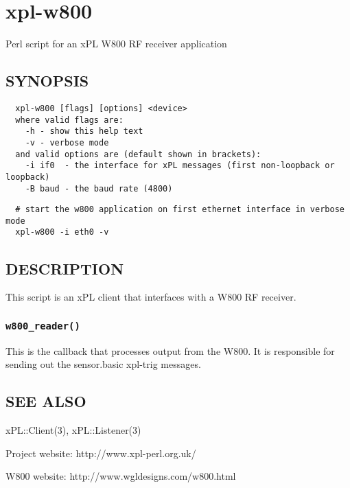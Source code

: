 \section{xpl-w800\label{xpl-w800}}


Perl script for an xPL W800 RF receiver application

\subsection*{SYNOPSIS\label{xpl-w800_SYNOPSIS}}
\begin{verbatim}
  xpl-w800 [flags] [options] <device>
  where valid flags are:
    -h - show this help text
    -v - verbose mode
  and valid options are (default shown in brackets):
    -i if0  - the interface for xPL messages (first non-loopback or loopback)
    -B baud - the baud rate (4800)
\end{verbatim}
\begin{verbatim}
  # start the w800 application on first ethernet interface in verbose mode
  xpl-w800 -i eth0 -v
\end{verbatim}
\subsection*{DESCRIPTION\label{xpl-w800_DESCRIPTION}}


This script is an xPL client that interfaces with a W800 RF receiver.

\subsubsection*{\texttt{w800\_reader()}\label{xpl-w800_w800_reader_}}


This is the callback that processes output from the W800.  It is
responsible for sending out the sensor.basic xpl-trig messages.

\subsection*{SEE ALSO\label{xpl-w800_SEE_ALSO}}


xPL::Client(3), xPL::Listener(3)



Project website: http://www.xpl-perl.org.uk/



W800 website: http://www.wgldesigns.com/w800.html

